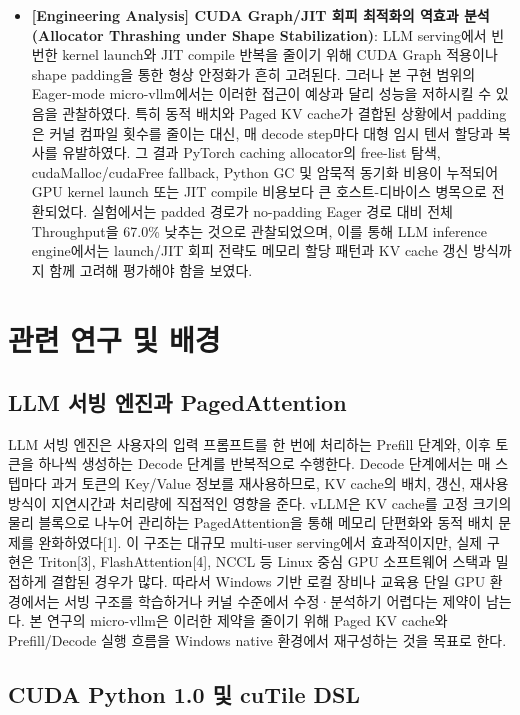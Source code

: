 \documentclass{kcc} %
\begin{document}
\begin{itemize}
\item \textbf{[Engineering Analysis] CUDA Graph/JIT 회피 최적화의 역효과 분석 (Allocator Thrashing under Shape Stabilization)}: LLM serving에서 빈번한 kernel launch와 JIT compile 반복을 줄이기 위해 CUDA Graph 적용이나 shape padding을 통한 형상 안정화가 흔히 고려된다. 그러나 본 구현 범위의 Eager-mode micro-vllm에서는 이러한 접근이 예상과 달리 성능을 저하시킬 수 있음을 관찰하였다. 특히 동적 배치와 Paged KV cache가 결합된 상황에서 padding은 커널 컴파일 횟수를 줄이는 대신, 매 decode step마다 대형 임시 텐서 할당과 복사를 유발하였다. 그 결과 PyTorch caching allocator의 free-list 탐색, cudaMalloc/cudaFree fallback, Python GC 및 암묵적 동기화 비용이 누적되어 GPU kernel launch 또는 JIT compile 비용보다 큰 호스트-디바이스 병목으로 전환되었다. 실험에서는 padded 경로가 no-padding Eager 경로 대비 전체 Throughput을 67.0\% 낮추는 것으로 관찰되었으며, 이를 통해 LLM inference engine에서는 launch/JIT 회피 전략도 메모리 할당 패턴과 KV cache 갱신 방식까지 함께 고려해 평가해야 함을 보였다.
\end{itemize}


\section{관련 연구 및 배경}

\subsection{LLM 서빙 엔진과 PagedAttention}

LLM 서빙 엔진은 사용자의 입력 프롬프트를 한 번에 처리하는 Prefill 단계와, 이후 토큰을 하나씩 생성하는 Decode 단계를 반복적으로 수행한다. Decode 단계에서는 매 스텝마다 과거 토큰의 Key/Value 정보를 재사용하므로, KV cache의 배치, 갱신, 재사용 방식이 지연시간과 처리량에 직접적인 영향을 준다. vLLM은 KV cache를 고정 크기의 물리 블록으로 나누어 관리하는 PagedAttention을 통해 메모리 단편화와 동적 배치 문제를 완화하였다[1]. 이 구조는 대규모 multi-user serving에서 효과적이지만, 실제 구현은 Triton[3], FlashAttention[4], NCCL 등 Linux 중심 GPU 소프트웨어 스택과 밀접하게 결합된 경우가 많다. 따라서 Windows 기반 로컬 장비나 교육용 단일 GPU 환경에서는 서빙 구조를 학습하거나 커널 수준에서 수정·분석하기 어렵다는 제약이 남는다. 본 연구의 micro-vllm은 이러한 제약을 줄이기 위해 Paged KV cache와 Prefill/Decode 실행 흐름을 Windows native 환경에서 재구성하는 것을 목표로 한다.


\subsection{CUDA Python 1.0 및 cuTile DSL}
\end{document}
